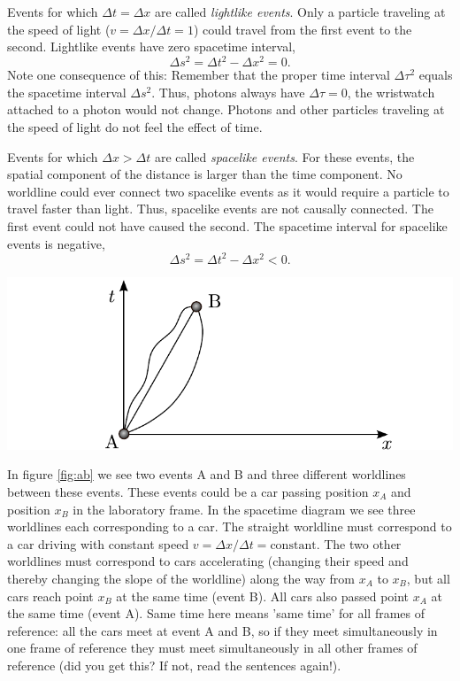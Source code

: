 {\begin{multicols}{2}
Events for which $\Delta t=\Delta x$ are called {\it lightlike events\label{pg:lightlike}}. Only a particle traveling at the speed of light ($v=\Delta x/\Delta t=1$) could travel from the first event to the second. Lightlike events have zero spacetime interval,
\[
\Delta s^2=\Delta t^2-\Delta x^2=0.
\]
Note one consequence of this: Remember that the proper time interval $\Delta \tau^2$ equals the spacetime interval $\Delta s^2$. Thus, photons always have $\Delta \tau=0$, the wristwatch attached to a photon would not change. Photons and other particles traveling at the speed of light do not feel the effect of time.

Events for which $\Delta x>\Delta t$ are called {\it spacelike events\label{pg:spacelike}}. For these events, the spatial component of the distance is larger than the time component. No worldline could ever connect two spacelike events as it would require a particle to travel faster than light. Thus, spacelike events are not causally connected. The first event could not have caused the second. The spacetime interval for spacelike events is negative,
\[
\Delta s^2=\Delta t^2-\Delta x^2<0.
\]

\begin{Figure}%
\centering
\includegraphics[width=\textwidth]{fig_9-2.pdf}
\end{Figure}

In figure \ref{fig:ab} we see two events A and B and three different worldlines between these events. These events could be a car passing position $x_A$ and position $x_B$ in the laboratory frame. In the spacetime diagram we see three worldlines each corresponding to a car. The straight worldline must correspond to a car driving with constant speed $v=\Delta x/\Delta t=\mathrm{constant}$. The two other worldlines must correspond to cars accelerating (changing their speed and thereby changing the slope of the worldline) along the way from $x_A$ to $x_B$, but all cars reach point $x_B$ at the same time (event B). All cars also passed point $x_A$ at the same time (event A). Same time here means 'same time' for all frames of reference: all the cars meet at event A and B, so if they meet simultaneously in one frame of reference they must meet simultaneously in all other frames of reference (did you get this? If not, read the sentences again!). 


\end{multicols}}
